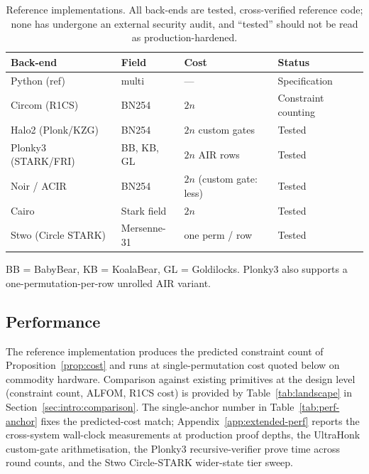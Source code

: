 \documentclass[11pt,a4paper]{article}
\theoremstyle{definition}
\begin{document}
\begin{table}[h]
\centering
\caption{Reference implementations. All back-ends are tested,
cross-verified reference code; none has undergone an external
security audit, and ``tested'' should not be read as
production-hardened.}
\label{tab:implementations}
\small
\begin{tabular}{@{}llll@{}}
\toprule
Back-end & Field & Cost & Status \\
\midrule
Python (ref)        & multi             & ---                     & Specification \\
Circom (R1CS)~\cite{Circom}       & BN254             & $2n$                    & Constraint counting \\
Halo2 (Plonk/KZG)~\cite{PLONK,Halo2}   & BN254             & $2n$ custom gates       & Tested \\
Plonky3 (STARK/FRI)~\cite{Plonky3} & BB, KB, GL        & $2n$ AIR rows           & Tested \\
Noir / ACIR         & BN254             & $2n$ (custom gate: less) & Tested \\
Cairo~\cite{Cairo_Goldberg}               & Stark field       & $2n$                    & Tested \\
Stwo (Circle STARK) & Mersenne-31       & one perm / row          & Tested \\
\bottomrule
\end{tabular}
\smallskip

\footnotesize
BB = BabyBear, KB = KoalaBear, GL = Goldilocks. Plonky3 also supports a
one-permutation-per-row unrolled AIR variant.
\end{table}


\subsection{Performance}\label{sec:impl:performance}

The reference implementation produces the predicted constraint count
of Proposition~\ref{prop:cost} and runs at single-permutation cost
quoted below on commodity hardware. Comparison against existing
primitives at the design level (constraint count, ALFOM, R1CS cost)
is provided by Table~\ref{tab:landscape} in
Section~\ref{sec:intro:comparison}. The single-anchor number in
Table~\ref{tab:perf-anchor} fixes the predicted-cost match;
Appendix~\ref{app:extended-perf} reports the cross-system wall-clock
measurements at production proof depths, the UltraHonk custom-gate
arithmetisation, the Plonky3 recursive-verifier prove time across
round counts, and the Stwo Circle-STARK wider-state tier sweep.
\end{document}
